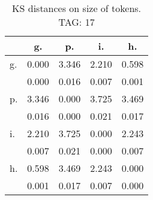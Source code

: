 \begin{table}[h!]
\begin{center}
\begin{tabular}{| l | c | c | c | c |}\hline
 & g. & p. & i. & h. \\\hline
g. & 0.000  & 3.346  & 2.210  & 0.598 \\\hline
 & 0.000  & 0.016  & 0.007  & 0.001 \\\hline
p. & 3.346  & 0.000  & 3.725  & 3.469 \\\hline
 & 0.016  & 0.000  & 0.021  & 0.017 \\\hline
i. & 2.210  & 3.725  & 0.000  & 2.243 \\\hline
 & 0.007  & 0.021  & 0.000  & 0.007 \\\hline
h. & 0.598  & 3.469  & 2.243  & 0.000 \\\hline
 & 0.001  & 0.017  & 0.007  & 0.000 \\\hline
\end{tabular}
\caption{KS distances on size of tokens. TAG: 17}
\end{center}
\end{table}